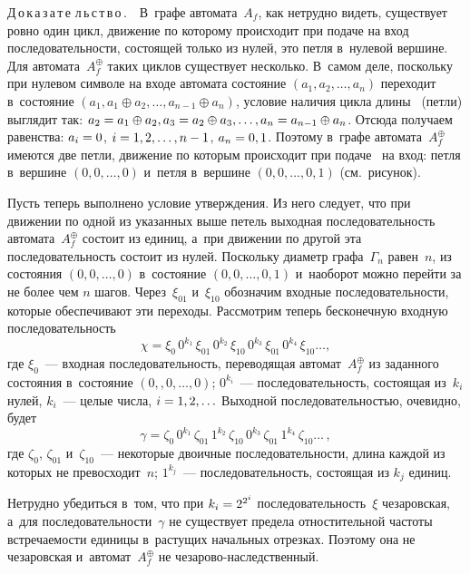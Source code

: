 \begin{multicols}{2}
  \noindent 
  Д\,о\,к\,а\,з\,а\,т\,е\,\,л\,ь\,с\,т\,в\,о\,.\ \ В~графе автомата~$A_f$, как нетрудно 
видеть, существует ровно один цикл, движение по которому происходит при 
подаче на вход последовательности, состоящей только из нулей, это петля 
в~нулевой вершине. Для автомата~$A_f^{\oplus}$ таких циклов существует 
несколько. В~самом деле, поскольку при нулевом символе на входе автомата 
состояние $(a_1, a_2, \ldots , a_n)$ переходит в~состояние $(a_1,a_1\oplus 
a_2,\ldots , a_{n-1}\oplus a_n)$, условие наличия цикла длины~  (петли) 
выглядит так: $a_2\hm= a_1\oplus a_2, a_3\hm=a_2\oplus a_3,\ldots , 
a_n\hm=a_{n-1}\oplus a_n$. Отсюда получаем равенства: $a_i\hm=0$, 
$i\hm=1,2,\ldots , n-1$, $a_n\hm=0,1$. Поэтому в~графе 
автомата~$A_f^{\oplus}$ имеются две петли, движение по которым происходит 
при подаче~  на вход: петля в~вершине $(0,0,\ldots ,0)$ и~петля в~вершине 
$(0,0,\ldots , 0,1)$ (см.\ рисунок). 
  
  Пусть теперь выполнено условие утверждения. Из него следует, что при 
движении по одной из указанных выше петель выходная последовательность 
автомата~$A_f^{\oplus}$ состоит из единиц, а~при движении по другой эта 
последовательность состоит из нулей. Поскольку диаметр графа~$\Gamma_n$ 
равен~$n$, из состояния $(0,0,\ldots ,0)$ в~состояние $(0,0,\ldots , 0,1)$ 
и~наоборот можно перейти за не более чем $n$ шагов. Через~$\xi_{01}$ 
и~$\xi_{10}$   обозначим входные последовательности, которые 
обеспечивают эти переходы. Рассмотрим теперь бесконечную входную 
последовательность
  $$
  \chi=\xi_0\, 0^{k_1}\, \xi_{01}\, 0^{k_2}\, \xi_{10}\,
   0^{k_3}\, \xi_{01}\, 0^{k_4} \,
\xi_{10}\ldots ,
  $$
где $\xi_0$~--- входная последовательность, переводящая 
автомат~$A_f^{\oplus}$ из заданного состояния в~состояние $(0,,0,\ldots ,0)$; 
$0^{k_i}$~--- последовательность, состоящая из~$k_i$ нулей, $k_i$~--- целые 
числа, $i\hm=1,2,\ldots$ Выходной последовательностью, очевидно, будет
$$
\gamma= \zeta_0 \,0^{k_1} \,\zeta_{01}\, 1^{k_2}\, \zeta_{10}\, 0^{k_3}\, \zeta_{01} \,
1^{k_4}\, \zeta_{10}\ldots\,,
$$
где $\zeta_0$, $\zeta_{01}$ и~$\zeta_{10}$~--- некоторые двоичные 
последовательности, длина каждой из которых не превосходит~$n$; 
$1^{k_j}$~--- последовательность, состоящая из $k_j$ единиц.
  
  Нетрудно убедиться в~том, что при $k_i\hm= 2^{2^i}$ 
последовательность~$\xi$ чезаровская, а~для последовательности~$\gamma$ не 
существует предела отностительной частоты встречаемости единицы 
в~растущих начальных отрезках. Поэтому она не чезаровская 
и~автомат~$A_f^{\oplus}$ не че\-за\-ро\-во-на\-след\-ст\-вен\-ный.
  

\end{multicols}
